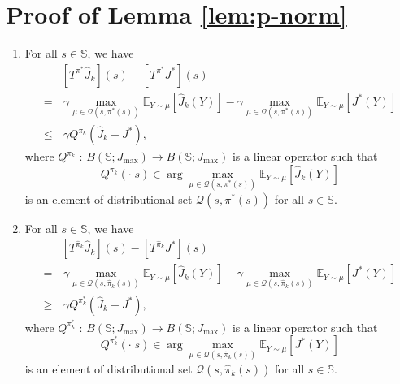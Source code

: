 \documentclass[12pt,technote,onecolumn]{IEEEtran}
\begin{document}
\section*{Proof of Lemma \ref{lem:p-norm}}
\begin{IEEEproof}
	\begin{enumerate}
	\item For all $s\in\mathbb{S}$, we have
	\begin{equation*}		
	\begin{aligned}
	&[T^{\pi^{*}}\widehat{J}_{k}]\left(s\right)-[T^{\pi^{*}}J^{*}]\left(s\right)\\
	=&\,  \gamma\max_{\mu\in\mathcal{Q}\left(s,\pi^{*}\left(s\right)\right)}\mathbb{E}_{Y\sim\mu}[\widehat{J}_{k}\left(Y\right)]-\gamma\max_{\mu\in\mathcal{Q}\left(s,\pi^{*}\left(s\right)\right)}\mathbb{E}_{Y\sim\mu}[J^{*}\left(Y\right)]\\
	\leq&\,\gamma Q^{\pi_{k}}(\widehat{J}_{k}-J^{*}),
	\end{aligned}
	\end{equation*}
	where $Q^{\pi_{k}}\mbox{ : }B\left(\mathbb{S};J_{\max}\right)\rightarrow B\left(\mathbb{S};J_{\max}\right)$
	is a linear operator such that 
	$$Q^{\pi_{k}}(\cdot\vert s)\in\arg\max_{\mu\in\mathcal{Q}(s,\pi^{*}(s))}\mathbb{E}_{Y\sim\mu}[\widehat{J}_{k}(Y)]$$
	is an element of distributional set $\mathcal{Q}\left(s,\pi^{*}\left(s\right)\right)$
	for all $s\in\mathbb{S}.$
	\item 	For all $s\in\mathbb{S}$, we have
	\begin{equation*}		
	\begin{aligned}
	&[T^{\hat{\pi}_{k}}\widehat{J}_{k}]\left(s\right)-\left[T^{\hat{\pi}_{k}}J^{*}\right]\left(s\right)\\
	=&\, \gamma\max_{\mu\in\mathcal{Q}\left(s,\hat{\pi}_{k}\left(s\right)\right)}\mathbb{E}_{Y\sim\mu}[\widehat{J}_{k}\left(Y\right)]-\gamma\max_{\mu\in\mathcal{Q}\left(s,\hat{\pi}_{k}\left(s\right)\right)}\mathbb{E}_{Y\sim\mu}[J^{*}\left(Y\right)]\\
	\geq&\,\gamma Q^{\pi_{k}^{*}}(\widehat{J}_{k}-J^{*}),
	\end{aligned}
	\end{equation*}
	where $Q^{\pi_{k}^{*}}\mbox{ : }B\left(\mathbb{S};J_{\max}\right)\rightarrow B\left(\mathbb{S};J_{\max}\right)$
	is a linear operator such that 
	$$Q^{\pi_{k}^{*}}(\cdot\vert s)\in\arg\max_{\mu\in\mathcal{Q}(s,\hat{\pi}_{k}(s))}\mathbb{E}_{Y\sim\mu}[J^{*}(Y)]$$
	is an element of distributional set $\mathcal{Q}\left(s,\hat{\pi}_{k}\left(s\right)\right)$
	for all $s\in\mathbb{S}.$
	\end{enumerate}
\end{IEEEproof}
\end{document}
